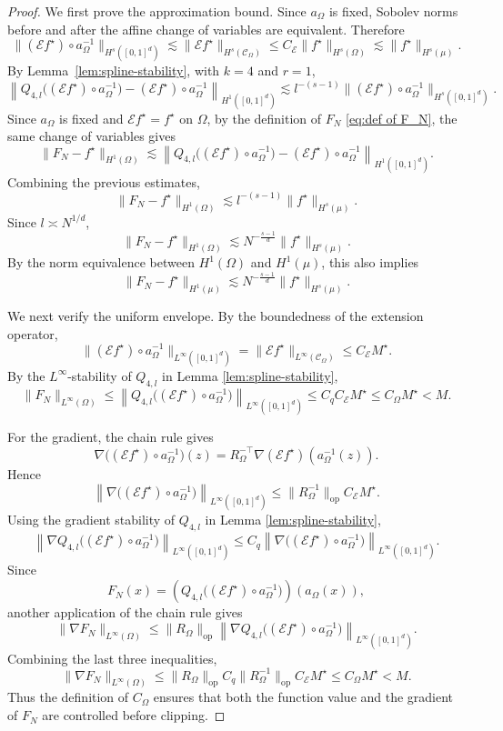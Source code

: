 \documentclass[10pt,a4paper]{amsart}
\begin{document}
\begin{proof}
We first prove the approximation bound. Since \(a_\Omega\) is fixed, Sobolev
norms before and after the affine change of variables are equivalent.
Therefore
\[
\|(\mathcal E f^\star)\circ a_\Omega^{-1}\|_{H^s([0,1]^d)}
\lesssim
\|\mathcal E f^\star\|_{H^s(\mathcal C_\Omega)}
\le
C_{\mathcal E}\|f^\star\|_{H^s(\Omega)}
\lesssim
\|f^\star\|_{H^s(\mu)}.
\]
By Lemma~\ref{lem:spline-stability}, with \(k=4\) and \(r=1\),
\[
\left\|
Q_{4,l}\bigl((\mathcal E f^\star)\circ a_\Omega^{-1}\bigr)
-
(\mathcal E f^\star)\circ a_\Omega^{-1}
\right\|_{H^1([0,1]^d)}
\lesssim
l^{-(s-1)}
\|(\mathcal E f^\star)\circ a_\Omega^{-1}\|_{H^s([0,1]^d)}.
\]
Since \(a_\Omega\) is fixed and \(\mathcal E f^\star=f^\star\) on
\(\Omega\), by the definition of $F_N$ \eqref{eq:def of F_N}, the same change of variables gives
\[
\|F_N-f^\star\|_{H^1(\Omega)}
\lesssim
\left\|
Q_{4,l}\bigl((\mathcal E f^\star)\circ a_\Omega^{-1}\bigr)
-
(\mathcal E f^\star)\circ a_\Omega^{-1}
\right\|_{H^1([0,1]^d)}.
\]
Combining the previous estimates,
\[
\|F_N-f^\star\|_{H^1(\Omega)}
\lesssim
l^{-(s-1)}
\|f^\star\|_{H^s(\mu)}.
\]
Since \(l\asymp N^{1/d}\),
\[
\|F_N-f^\star\|_{H^1(\Omega)}
\lesssim
N^{-\frac{s-1}{d}}
\|f^\star\|_{H^s(\mu)}.
\]
By the norm equivalence between \(H^1(\Omega)\) and \(H^1(\mu)\), this
also implies
\[
\|F_N-f^\star\|_{H^1(\mu)}
\lesssim
N^{-\frac{s-1}{d}}
\|f^\star\|_{H^s(\mu)}.
\]

We next verify the uniform envelope. By the boundedness of the extension
operator,
\[
\|(\mathcal E f^\star)\circ a_\Omega^{-1}\|_{L^\infty([0,1]^d)}
=
\|\mathcal E f^\star\|_{L^\infty(\mathcal C_\Omega)}
\le
C_{\mathcal E}M^\star .
\]
By the \(L^\infty\)-stability of \(Q_{4,l}\) in Lemma \ref{lem:spline-stability},
\[
\|F_N\|_{L^\infty(\Omega)}
\le
\left\|
Q_{4,l}\bigl((\mathcal E f^\star)\circ a_\Omega^{-1}\bigr)
\right\|_{L^\infty([0,1]^d)}
\le
C_qC_{\mathcal E}M^\star
\le
C_\Omega M^\star
<
M.
\]

For the gradient, the chain rule gives
\[
\nabla\bigl((\mathcal E f^\star)\circ a_\Omega^{-1}\bigr)(z)
=
R_\Omega^{-\top}
\nabla(\mathcal E f^\star)(a_\Omega^{-1}(z)).
\]
Hence
\[
\left\|
\nabla\bigl((\mathcal E f^\star)\circ a_\Omega^{-1}\bigr)
\right\|_{L^\infty([0,1]^d)}
\le
\|R_\Omega^{-1}\|_{\mathrm{op}}C_{\mathcal E}M^\star .
\]
Using the gradient stability of \(Q_{4,l}\) in Lemma \ref{lem:spline-stability},
\[
\left\|
\nabla Q_{4,l}\bigl((\mathcal E f^\star)\circ a_\Omega^{-1}\bigr)
\right\|_{L^\infty([0,1]^d)}
\le
C_q
\left\|
\nabla\bigl((\mathcal E f^\star)\circ a_\Omega^{-1}\bigr)
\right\|_{L^\infty([0,1]^d)}.
\]
Since
\[
F_N(x)
=
\left(
Q_{4,l}\bigl((\mathcal E f^\star)\circ a_\Omega^{-1}\bigr)
\right)(a_\Omega(x)),
\]
another application of the chain rule gives
\[
\|\nabla F_N\|_{L^\infty(\Omega)}
\le
\|R_\Omega\|_{\mathrm{op}}
\left\|
\nabla Q_{4,l}\bigl((\mathcal E f^\star)\circ a_\Omega^{-1}\bigr)
\right\|_{L^\infty([0,1]^d)}.
\]
Combining the last three inequalities,
\[
\|\nabla F_N\|_{L^\infty(\Omega)}
\le
\|R_\Omega\|_{\mathrm{op}}
C_q
\|R_\Omega^{-1}\|_{\mathrm{op}}
C_{\mathcal E}M^\star
\le
C_\Omega M^\star
<
M.
\]
Thus the definition of \(C_\Omega\) ensures that both the function value and
the gradient of \(F_N\) are controlled before clipping.


\end{proof}
\end{document}
